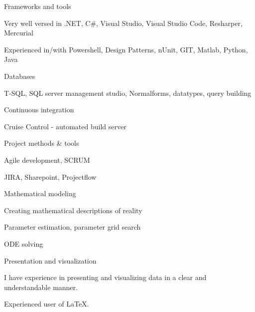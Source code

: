 


\begin{cvskills}

\cvskill
{Frameworks and tools} %
{
\begin{cvitems}
  \vspace{2mm}
\item {Very well versed in .NET, C\#, Visual Studio, Visual Studio Code, Resharper, Mercurial} 
\item Experienced in/with Powershell, Design Patterns, nUnit, GIT, Matlab, Python, Java
\end{cvitems}
}

\cvskill
{Databases} %
{
\begin{cvitems}
  \vspace{2mm}
\item {T-SQL, SQL server management studio, Normalforms, datatypes, query building}
\end{cvitems}
}

\cvskill
{Continuous integration} %
{
\begin{cvitems}
  \vspace{2mm}
\item {Cruise Control - automated build server}
\end{cvitems}
}

\cvskill
{Project methods \& tools} %
{
\begin{cvitems}
  \vspace{2mm}
\item {Agile development, SCRUM}
\item JIRA, Sharepoint, Projectflow
\end{cvitems}
}

\cvskill
{Mathematical modeling} %
{
\begin{cvitems}
  \vspace{2mm}
\item {Creating mathematical descriptions of reality}
\item Parameter estimation, parameter grid search
\item ODE solving
\end{cvitems}
}

\cvskill
{Presentation and visualization} %
{
\begin{cvitems}
  \vspace{2mm}
\item {I have experience in presenting and visualizing data in a clear and understandable manner.}
\item Experienced user of \LaTeX.
\end{cvitems}
}

\end{cvskills}


